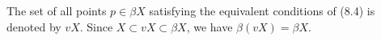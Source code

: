 The set of all points $p \in \beta X$ satisfying the equivalent conditions of (8.4) is denoted by $vX$. Since $X \subset vX \subset \beta X$, we have $\beta(vX) = \beta X$.
